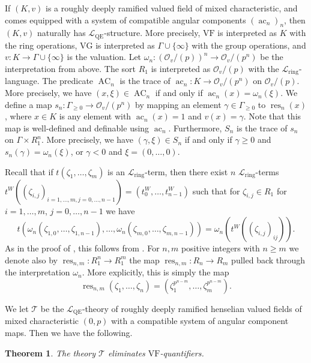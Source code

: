 \documentclass[a4paper]{amsart}
\theoremstyle{mystyle2}
\newtheorem{thm}{Theorem}[section]
\theoremstyle{mystyle}
\DeclareMathOperator{\res}{res}
\DeclareMathOperator{\ac}{ac}
\newcommand{\map}[1]{\omega_{#1}}
\DeclareMathOperator{\AC}{AC}
\newcommand{\cT}{\mathcal{T}}
\renewcommand{\L}{\mathcal{L}}
\newcommand{\Lring}{\L_{\mathrm{ring}}}
\renewcommand{\O}{\mathcal{O}}
\newcommand{\LQE}{\L_\mathrm{QE}}
\newcommand{\VF}{\mathrm{VF}}
\newcommand{\VG}{\mathrm{VG}}
\numberwithin{equation}{section}
\begin{document}
    If $(K,v)$ is a roughly deeply ramified valued field of mixed characteristic, and comes equipped with a system of compatible angular components $(\ac_n)_n$, then $(K,v)$ naturally has $\LQE$-structure.
    More precisely, $\VF$ is interpreted as $K$ with the ring operations, $\VG$ is interpreted as $\Gamma\cup\{\infty\}$ with the group operations, and $v\colon K\to \Gamma\cup\{\infty\}$ is the valuation.
    Let $\omega_n\colon (\O_v/(p))^n\to \O_v/(p^n)$ be the interpretation from above.
    The sort $R_1$ is interpreted as $\O_v/(p)$ with the $\Lring$-language.
    The predicate $\AC_n$ is the trace of $\ac_n\colon K\to \O_v/(p^n)$ on $\O_v/(p)$.
    More precisely, we have $(x,\xi)\in \AC_n$ if and only if $\ac_n(x) = \omega_n(\xi)$.
    We define a map $s_n\colon \Gamma_{\geq 0}\to \O_v/(p^n)$ by mapping an element $\gamma\in \Gamma_{\geq 0}$ to $\res_n(x)$, where $x\in K$ is any element with $\ac_n(x) = 1$ and $v(x) = \gamma$.
    Note that this map is well-defined and definable using $\ac_n$.
    Furthermore, $S_n$ is the trace of $s_n$ on $\Gamma \times R_1^n$.
    More precisely, we have $(\gamma, \xi)\in S_n$ if and only if $\gamma \geq 0$ and $s_n(\gamma) = \omega_n(\xi)$, or $\gamma < 0$ and $\xi = (0, \ldots, 0)$.

    Recall that if $t(\zeta_1, \ldots, \zeta_m)$ is an $\Lring$-term, then there exist $n$ $\Lring$-terms $t^W((\zeta_{i,j})_{i=1, \ldots, m, j=0, \ldots, n-1}) = (t^W_0, \ldots, t^W_{n-1})$ such that for $\zeta_{i,j}\in R_1$ for $i=1, \ldots, m$, $j=0, \ldots, n-1$ we have
    \[
    t(\map{n}(\zeta_{1,0}, \ldots, \zeta_{1,n-1}), \ldots, \map{n}(\zeta_{m,0}, \ldots, \zeta_{m,n-1})) = \map{n} (t^W((\zeta_{i,j})_{ij})).
    \]
    As in the proof of , this follows from \cite[Lemma~6.5]{vdd}.
    For $n,m$ positive integers with $n\geq m$ we denote also by $\res_{n,m}\colon R_1^n\to R_1^m$ the map $\res_{n,m}\colon R_n\to R_m$ pulled back through the interpretation $\map{n}$.
    More explicitly, this is simply the map
    \[
    \res_{n,m}(\zeta_1, \ldots, \zeta_n) = (\zeta_1^{p^{n-m}}, \ldots, \zeta_m^{p^{n-m}}). 
    \]

    We let $\cT$ be the $\LQE$-theory of roughly deeply ramified henselian valued fields of mixed characteristic $(0,p)$ with a compatible system of angular component maps.
    Then we have the following.

    \begin{thm}
    \label{thm:qe}
        The theory $\cT$ eliminates $\VF$-quantifiers.
    \end{thm}
\end{document}
